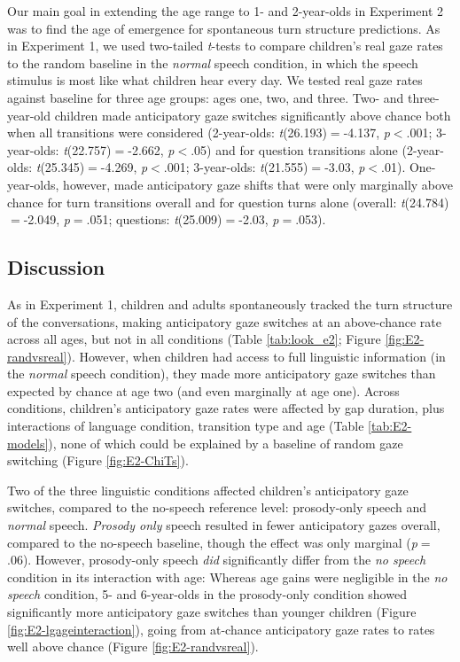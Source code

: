 \documentclass[authoryear, 12pt]{elsarticle}
\begin{document}
Our main goal in extending the age range to 1- and 2-year-olds in Experiment 2 was to find the age of emergence for spontaneous turn structure predictions. As in Experiment 1, we used two-tailed \textit{t}-tests to compare children's real gaze rates to the random baseline in the \textit{normal} speech condition, in which the speech stimulus is most like what children hear every day. We tested real gaze rates against baseline for three age groups: ages one, two, and three. Two- and three-year-old children made anticipatory gaze switches significantly above chance both when all transitions were considered (2-year-olds: \textit{t}(26.193)$=$-4.137, \textit{p}$<$.001; 3-year-olds: \textit{t}(22.757)$=$-2.662, \textit{p}$<$.05) and for question transitions alone (2-year-olds: \textit{t}(25.345)$=$-4.269, \textit{p}$<$.001; 3-year-olds: \textit{t}(21.555)$=$-3.03, \textit{p}$<$.01). One-year-olds, however, made anticipatory gaze shifts that were only marginally above chance for turn transitions overall and for question turns alone (overall: \textit{t}(24.784)$=$-2.049, \textit{p}$=$.051; questions: \textit{t}(25.009)$=$-2.03, \textit{p}$=$.053).

\subsection{Discussion}
\label{sec:discussion2}
As in Experiment 1, children and adults spontaneously tracked the turn structure of the conversations, making anticipatory gaze switches at an above-chance rate across all ages, but not in all conditions (Table \ref{tab:look_e2}; Figure \ref{fig:E2-randvsreal}). However, when children had access to full linguistic information (in the \textit{normal} speech condition), they made more anticipatory gaze switches than expected by chance at age two (and even marginally at age one). Across conditions, children's anticipatory gaze rates were affected by gap duration, plus interactions of language condition, transition type and age (Table \ref{tab:E2-models}), none of which could be explained by a baseline of random gaze switching (Figure \ref{fig:E2-ChiTs}).

Two of the three linguistic conditions affected children's anticipatory gaze switches, compared to the no-speech reference level: prosody-only speech and \textit{normal} speech. \textit{Prosody only} speech resulted in fewer anticipatory gazes overall, compared to the no-speech baseline, though the effect was only marginal (\textit{p}$=$.06). However, prosody-only speech \textit{did} significantly differ from the \textit{no speech} condition in its interaction with age: Whereas age gains were negligible in the \textit{no speech} condition, 5- and 6-year-olds in the prosody-only condition showed significantly more anticipatory gaze switches than younger children (Figure \ref{fig:E2-lgageinteraction}), going from at-chance anticipatory gaze rates to rates well above chance (Figure \ref{fig:E2-randvsreal}).
\end{document}
